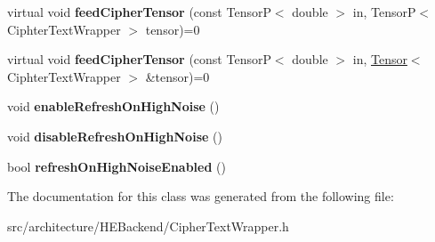 \begin{DoxyCompactItemize}
\item 
\mbox{\label{classCipherTextWrapperFactory_ae6baa28f8eaee6ab89ae0d3803bdaf2e}} 
virtual void {\bfseries feed\+Cipher\+Tensor} (const TensorP$<$ double $>$ in, TensorP$<$ Ciphter\+Text\+Wrapper $>$ tensor)=0
\item 
\mbox{\label{classCipherTextWrapperFactory_a1aae33d3536a33fac5161b862f094123}} 
virtual void {\bfseries feed\+Cipher\+Tensor} (const TensorP$<$ double $>$ in, \hyperlink{classTensor}{Tensor}$<$ Ciphter\+Text\+Wrapper $>$ \&tensor)=0
\item 
\mbox{\label{classCipherTextWrapperFactory_a41a57dbe2970b399e2b9c55befec9a39}} 
void {\bfseries enable\+Refresh\+On\+High\+Noise} ()
\item 
\mbox{\label{classCipherTextWrapperFactory_af2fd9b0b79bafca9c4a46895afcc5ccb}} 
void {\bfseries disable\+Refresh\+On\+High\+Noise} ()
\item 
\mbox{\label{classCipherTextWrapperFactory_ac4bbd9e27c7d4a49212c9002213668a7}} 
bool {\bfseries refresh\+On\+High\+Noise\+Enabled} ()
\end{DoxyCompactItemize}


The documentation for this class was generated from the following file\+:\begin{DoxyCompactItemize}
\item 
src/architecture/\+H\+E\+Backend/Cipher\+Text\+Wrapper.\+h\end{DoxyCompactItemize}
